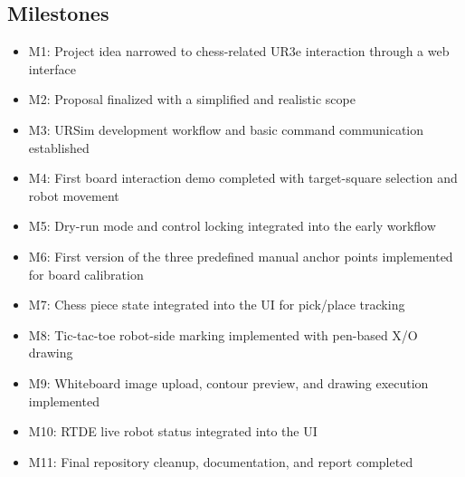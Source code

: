 \documentclass[12pt]{article}
\begin{document}
\subsection{Milestones}
\begin{itemize}[leftmargin=*]
\item M1: Project idea narrowed to chess-related UR3e interaction through a web interface
\item M2: Proposal finalized with a simplified and realistic scope
\item M3: URSim development workflow and basic command communication established
\item M4: First board interaction demo completed with target-square selection and robot movement
\item M5: Dry-run mode and control locking integrated into the early workflow
\item M6: First version of the three predefined manual anchor points implemented for board calibration
\item M7: Chess piece state integrated into the UI for pick/place tracking
\item M8: Tic-tac-toe robot-side marking implemented with pen-based X/O drawing
\item M9: Whiteboard image upload, contour preview, and drawing execution implemented
\item M10: RTDE live robot status integrated into the UI
\item M11: Final repository cleanup, documentation, and report completed
\end{itemize}
\end{document}
